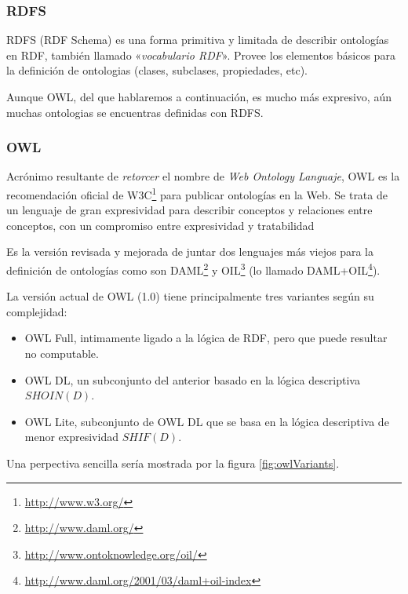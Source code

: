 \subsubsection{RDFS}

RDFS\cite{RDFS} (RDF Schema) es una forma primitiva y limitada de describir 
ontologías en RDF, también llamado «\emph{vocabulario RDF}». Provee los elementos
básicos para la definición de ontologias (clases, subclases, propiedades, etc).

Aunque OWL, del que hablaremos a continuación, es mucho más expresivo, aún muchas
ontologias se encuentras definidas con RDFS.

\subsubsection{OWL}

Acrónimo resultante de \emph{retorcer} el nombre de 
\emph{Web Ontology Languaje}, OWL\cite{OWL} es la recomendación 
oficial de W3C\footnote{\url{http://www.w3.org/}} para publicar ontologías en 
la Web. Se trata de un lenguaje de gran expresividad para describir conceptos 
y relaciones entre conceptos, con un compromiso entre expresividad y tratabilidad

Es la versión revisada y mejorada de juntar dos lenguajes más viejos para la 
definición de ontologías como son DAML\footnote{\url{http://www.daml.org/}} y 
OIL\footnote{\url{http://www.ontoknowledge.org/oil/}} (lo llamado
DAML+OIL\footnote{\url{http://www.daml.org/2001/03/daml+oil-index}}).

La versión actual de OWL (1.0) tiene principalmente tres variantes según su
complejidad:

\begin{itemize}
  \item OWL Full, intimamente ligado a la lógica de RDF, pero que puede resultar
	no computable.
  \item OWL DL, un subconjunto del anterior basado en la lógica descriptiva 
	${SHOIN} (D)$.
  \item OWL Lite, subconjunto de OWL DL que se basa en la lógica descriptiva 
	de menor expresividad ${SHIF} (D)$.
\end{itemize}

Una perpectiva sencilla sería mostrada por la figura \ref{fig:owlVariants}.

